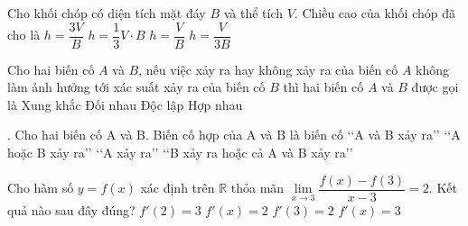 \begin{ex}%
Cho khối chóp có diện tích mặt đáy $B$ và thể tích $V$. Chiều cao của khối chóp đã cho là
\choice
{\True $h=\dfrac{3V}{B}$}
{$h=\dfrac{1}{3} V \cdot B$}
{$h=\dfrac{V}{B}$}
{$h=\dfrac{V}{3B}$}
\end{ex}

\begin{ex}%
Cho hai biến cố $A$ và $B$, nếu việc xảy ra hay không xảy ra của biến cố $A$ không làm ảnh hưởng tới xác suất xảy ra của biến cố $B$ thì hai biến cố $A$ và $B$ được gọi là
\choice
{Xung khắc}
{Đối nhau}
{\True Độc lập}
{Hợp nhau}
\end{ex}

\begin{ex}.%
Cho hai biến cố A và B. Biến cố hợp của A và B là biến cố
\choice
{\lq\lq A và B xảy ra\rq\rq }
{\True \lq\lq A hoặc B xảy ra\rq\rq }
{\lq\lq A xảy ra\rq\rq }
{\lq\lq B xảy ra hoặc cả A và B xảy ra\rq\rq }
\end{ex}

\begin{ex}    %
Cho hàm số $y = f(x)$ xác định trên $\mathbb{R}$ thỏa mãn $\lim\limits_{x\to 3}\dfrac{f(x)-f(3)}{x-3}=2$. Kết quả nào sau đây đúng?
\choice
{$f'(2)=3$}
{$f'(x)=2$}
{\True $f'(3)=2$}
{$f'(x)=3$}
\end{ex}

